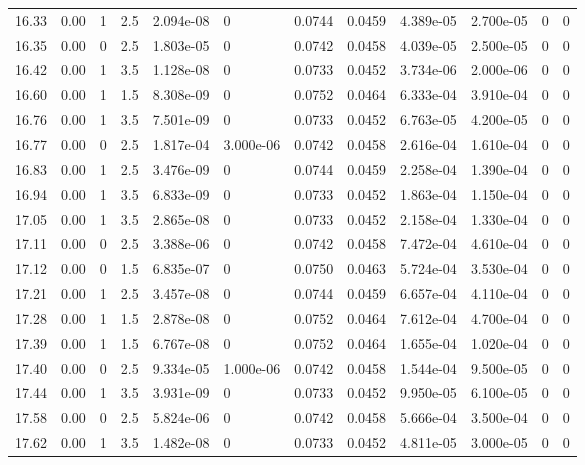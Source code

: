 \documentclass[preview]{standalone}
\begin{document}
{{{{{{\begin{tabular}{L{1.2cm}C{1.2cm} C{0.3cm}C{0.5cm} C{1.4cm}C{1.4cm} C{1.4cm}C{1.4cm} C{1.6cm}C{1.6cm} C{1.6cm}C{1.6cm}}
  16.33  &  0.00  & 1     & 2.5 &  2.094e-08  & 0  &  0.0744&   0.0459& 4.389e-05 & 2.700e-05   &  0 & 0  \\ 
  16.35  &  0.00  & 0     & 2.5 &  1.803e-05  & 0  &  0.0742&   0.0458& 4.039e-05 & 2.500e-05   &  0 & 0  \\ 
  16.42  &  0.00  & 1     & 3.5 &  1.128e-08  & 0  &  0.0733&   0.0452& 3.734e-06 & 2.000e-06   &  0 & 0  \\ 
  16.60  &  0.00  & 1     & 1.5 &  8.308e-09  & 0  &  0.0752&   0.0464& 6.333e-04 & 3.910e-04   &  0 & 0  \\ 
  16.76  &  0.00  & 1     & 3.5 &  7.501e-09  & 0  &  0.0733&   0.0452& 6.763e-05 & 4.200e-05   &  0 & 0  \\ 
  16.77  &  0.00  & 0     & 2.5 &  1.817e-04  & 3.000e-06  &  0.0742&   0.0458& 2.616e-04 & 1.610e-04   &  0 & 0  \\ 
  16.83  &  0.00  & 1     & 2.5 &  3.476e-09  & 0  &  0.0744&   0.0459& 2.258e-04 & 1.390e-04   &  0 & 0  \\ 
  16.94  &  0.00  & 1     & 3.5 &  6.833e-09  & 0  &  0.0733&   0.0452& 1.863e-04 & 1.150e-04   &  0 & 0  \\ 
  17.05  &  0.00  & 1     & 3.5 &  2.865e-08  & 0  &  0.0733&   0.0452& 2.158e-04 & 1.330e-04   &  0 & 0  \\ 
  17.11  &  0.00  & 0     & 2.5 &  3.388e-06  & 0  &  0.0742&   0.0458& 7.472e-04 & 4.610e-04   &  0 & 0  \\ 
  17.12  &  0.00  & 0     & 1.5 &  6.835e-07  & 0  &  0.0750&   0.0463& 5.724e-04 & 3.530e-04   &  0 & 0  \\ 
  17.21  &  0.00  & 1     & 2.5 &  3.457e-08  & 0  &  0.0744&   0.0459& 6.657e-04 & 4.110e-04   &  0 & 0  \\ 
  17.28  &  0.00  & 1     & 1.5 &  2.878e-08  & 0  &  0.0752&   0.0464& 7.612e-04 & 4.700e-04   &  0 & 0  \\ 
  17.39  &  0.00  & 1     & 1.5 &  6.767e-08  & 0  &  0.0752&   0.0464& 1.655e-04 & 1.020e-04   &  0 & 0  \\ 
  17.40  &  0.00  & 0     & 2.5 &  9.334e-05  & 1.000e-06  &  0.0742&   0.0458& 1.544e-04 & 9.500e-05   &  0 & 0  \\ 
  17.44  &  0.00  & 1     & 3.5 &  3.931e-09  & 0  &  0.0733&   0.0452& 9.950e-05 & 6.100e-05   &  0 & 0  \\ 
  17.58  &  0.00  & 0     & 2.5 &  5.824e-06  & 0  &  0.0742&   0.0458& 5.666e-04 & 3.500e-04   &  0 & 0  \\ 
  17.62  &  0.00  & 1     & 3.5 &  1.482e-08  & 0  &  0.0733&   0.0452& 4.811e-05 & 3.000e-05   &  0 & 0  \\ 

\end{tabular}}}}}}}
\end{document}
